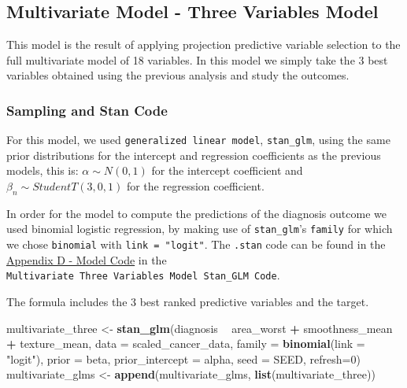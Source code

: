 \documentclass[
]{article}
\newenvironment{Shaded}{\begin{snugshade}}{\end{snugshade}}
\newcommand{\DataTypeTok}[1]{\textcolor[rgb]{0.13,0.29,0.53}{#1}}
\newcommand{\DecValTok}[1]{\textcolor[rgb]{0.00,0.00,0.81}{#1}}
\newcommand{\KeywordTok}[1]{\textcolor[rgb]{0.13,0.29,0.53}{\textbf{#1}}}
\newcommand{\NormalTok}[1]{#1}
\newcommand{\OperatorTok}[1]{\textcolor[rgb]{0.81,0.36,0.00}{\textbf{#1}}}
\newcommand{\StringTok}[1]{\textcolor[rgb]{0.31,0.60,0.02}{#1}}
\begin{document}
\hypertarget{multivariate-model---three-variables-model}{%
\subsection{Multivariate Model - Three Variables
Model}\label{multivariate-model---three-variables-model}}

This model is the result of applying projection predictive variable
selection to the full multivariate model of 18 variables. In this model
we simply take the 3 best variables obtained using the previous analysis
and study the outcomes.

\hypertarget{sampling-and-stan-code-1}{%
\subsubsection{Sampling and Stan Code}\label{sampling-and-stan-code-1}}

For this model, we used \texttt{generalized\ linear\ model},
\texttt{stan\_glm}, using the same prior distributions for the intercept
and regression coefficients as the previous models, this is:
\(\alpha \sim N(0,1)\) for the intercept coefficient and
\(\beta_n \sim StudentT(3,0,1)\) for the regression coefficient.

In order for the model to compute the predictions of the diagnosis
outcome we used binomial logistic regression, by making use of
\texttt{stan\_glm}'s \texttt{family} for which we chose
\texttt{binomial} with \texttt{link\ =\ "logit"}. The \texttt{.stan}
code can be found in the \protect\hyperlink{apb}{Appendix D - Model
Code} in the
\texttt{Multivariate\ Three\ Variables\ Model\ Stan\_GLM\ Code}.

The formula includes the 3 best ranked predictive variables and the
target.

\begin{Shaded}
\begin{Highlighting}[]
\NormalTok{multivariate_three <-}\StringTok{ }\KeywordTok{stan_glm}\NormalTok{(diagnosis }\OperatorTok{~}\StringTok{ }\NormalTok{area_worst }\OperatorTok{+}\StringTok{ }\NormalTok{smoothness_mean}
                               \OperatorTok{+}\StringTok{ }\NormalTok{texture_mean, }\DataTypeTok{data =}\NormalTok{ scaled_cancer_data,}
                               \DataTypeTok{family =} \KeywordTok{binomial}\NormalTok{(}\DataTypeTok{link =} \StringTok{"logit"}\NormalTok{), }
                               \DataTypeTok{prior =}\NormalTok{ beta, }\DataTypeTok{prior_intercept =}\NormalTok{ alpha,}
                               \DataTypeTok{seed =}\NormalTok{ SEED, }\DataTypeTok{refresh=}\DecValTok{0}\NormalTok{)}
\NormalTok{multivariate_glms <-}\StringTok{ }\KeywordTok{append}\NormalTok{(multivariate_glms, }\KeywordTok{list}\NormalTok{(multivariate_three))}
\end{Highlighting}
\end{Shaded}
\end{document}
